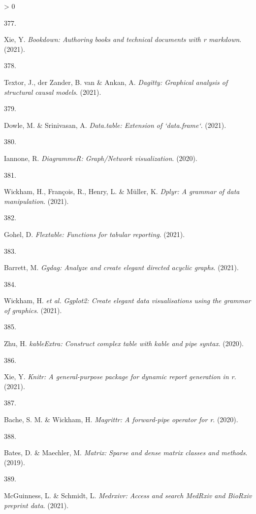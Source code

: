 \documentclass[a4paper, twoside]{templates/ociamthesis}
\newlength{\cslhangindent}
\newlength{\csllabelwidth}
\newenvironment{CSLReferences}[3] %
 {%
  \setlength{\parindent}{0pt}
  \ifodd #1 \everypar{\setlength{\hangindent}{\cslhangindent}}\ignorespaces\fi
  \ifnum #2 > 0
  \setlength{\parskip}{#2\baselineskip}
  \fi
 }%
 {}
\newcommand{\CSLLeftMargin}[1]{\parbox[t]{\maxof{\widthof{#1}}{\csllabelwidth}}{#1}}
\newcommand{\CSLRightInline}[1]{\parbox[t]{\linewidth - \csllabelwidth}{#1}}
\begin{document}
\begin{CSLReferences}{0}{0}
\leavevmode\hypertarget{ref-R-bookdown}{}%
\CSLLeftMargin{377. }
\CSLRightInline{Xie, Y. \emph{Bookdown: Authoring books and technical documents with r markdown}. (2021).}

\leavevmode\hypertarget{ref-R-dagitty}{}%
\CSLLeftMargin{378. }
\CSLRightInline{Textor, J., der Zander, B. van \& Ankan, A. \emph{Dagitty: Graphical analysis of structural causal models}. (2021).}

\leavevmode\hypertarget{ref-R-data.table}{}%
\CSLLeftMargin{379. }
\CSLRightInline{Dowle, M. \& Srinivasan, A. \emph{Data.table: Extension of `data.frame`}. (2021).}

\leavevmode\hypertarget{ref-R-DiagrammeR}{}%
\CSLLeftMargin{380. }
\CSLRightInline{Iannone, R. \emph{{DiagrammeR}: Graph/{Network} visualization}. (2020).}

\leavevmode\hypertarget{ref-R-dplyr}{}%
\CSLLeftMargin{381. }
\CSLRightInline{Wickham, H., François, R., Henry, L. \& Müller, K. \emph{Dplyr: A grammar of data manipulation}. (2021).}

\leavevmode\hypertarget{ref-R-flextable}{}%
\CSLLeftMargin{382. }
\CSLRightInline{Gohel, D. \emph{Flextable: Functions for tabular reporting}. (2021).}

\leavevmode\hypertarget{ref-R-ggdag}{}%
\CSLLeftMargin{383. }
\CSLRightInline{Barrett, M. \emph{Ggdag: Analyze and create elegant directed acyclic graphs}. (2021).}

\leavevmode\hypertarget{ref-R-ggplot2}{}%
\CSLLeftMargin{384. }
\CSLRightInline{Wickham, H. \emph{et al.} \emph{Ggplot2: Create elegant data visualisations using the grammar of graphics}. (2021).}

\leavevmode\hypertarget{ref-R-kableExtra}{}%
\CSLLeftMargin{385. }
\CSLRightInline{Zhu, H. \emph{{kableExtra}: Construct complex table with kable and pipe syntax}. (2020).}

\leavevmode\hypertarget{ref-R-knitr}{}%
\CSLLeftMargin{386. }
\CSLRightInline{Xie, Y. \emph{Knitr: A general-purpose package for dynamic report generation in r}. (2021).}

\leavevmode\hypertarget{ref-R-magrittr}{}%
\CSLLeftMargin{387. }
\CSLRightInline{Bache, S. M. \& Wickham, H. \emph{Magrittr: A forward-pipe operator for r}. (2020).}

\leavevmode\hypertarget{ref-R-Matrix}{}%
\CSLLeftMargin{388. }
\CSLRightInline{Bates, D. \& Maechler, M. \emph{Matrix: Sparse and dense matrix classes and methods}. (2019).}

\leavevmode\hypertarget{ref-R-medrxivr}{}%
\CSLLeftMargin{389. }
\CSLRightInline{McGuinness, L. \& Schmidt, L. \emph{Medrxivr: Access and search {MedRxiv} and {BioRxiv} preprint data}. (2021).}


\end{CSLReferences}
\end{document}
